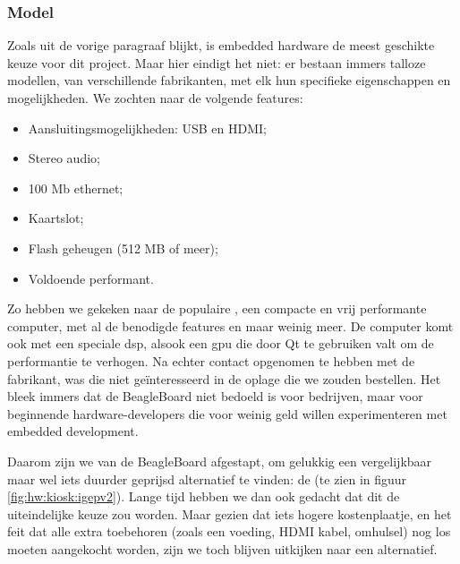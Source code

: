 \subsubsection{Model}

Zoals uit de vorige paragraaf blijkt, is embedded hardware de meest geschikte keuze voor dit project. Maar hier eindigt het niet: er bestaan immers talloze modellen, van verschillende fabrikanten, met elk hun specifieke eigenschappen en mogelijkheden. We zochten naar de volgende features:
\begin{itemize}
\item Aansluitingsmogelijkheden: USB en HDMI;
\item Stereo audio;
\item 100 Mb ethernet;
\item Kaartslot;
\item Flash geheugen (512 MB of meer);
\item Voldoende performant.
\end{itemize}

Zo hebben we gekeken naar de populaire , een compacte en vrij performante computer, met al de benodigde features en maar weinig meer. De computer komt ook met een speciale \ac{dsp}, alsook een \ac{gpu} die door Qt te gebruiken valt om de performantie te verhogen. Na echter contact opgenomen te hebben met de fabrikant, was die niet geïnteresseerd in de oplage die we zouden bestellen. Het bleek immers dat de BeagleBoard niet bedoeld is voor bedrijven, maar voor beginnende hardware-developers die voor weinig geld willen experimenteren met embedded development.

Daarom zijn we van de BeagleBoard afgestapt, om gelukkig een vergelijkbaar maar wel iets duurder geprijsd alternatief te vinden: de  (te zien in figuur \ref{fig:hw:kiosk:igepv2}). Lange tijd hebben we dan ook gedacht dat dit de uiteindelijke keuze zou worden. Maar gezien dat iets hogere kostenplaatje, en het feit dat alle extra toebehoren (zoals een voeding, HDMI kabel, omhulsel) nog los moeten aangekocht worden, zijn we toch blijven uitkijken naar een alternatief.

